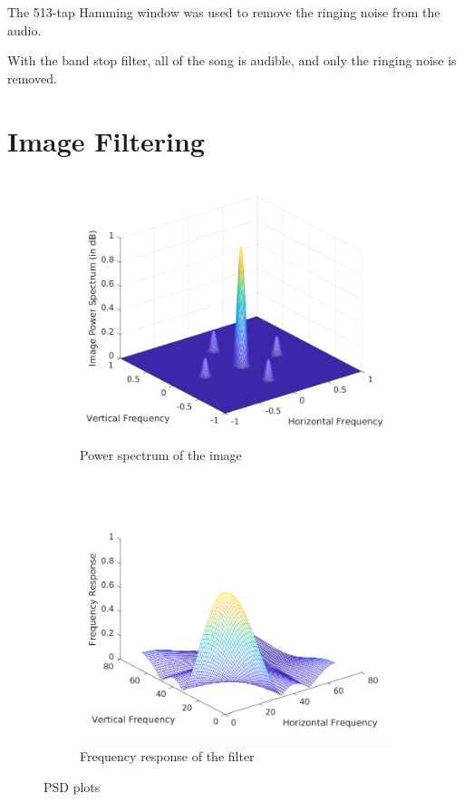 \documentclass{article}
\begin{document}
The 513-tap Hamming window was used to remove the ringing noise from the audio.

With the band stop filter, all of the song is audible, and only the ringing noise is removed.
\section{Image Filtering}

\begin{figure}[H]
    \centering
    \begin{subfigure}[b]{0.45\textwidth}
        \centering
        \includegraphics[width=\textwidth]{plot1.png}
        \caption{Power spectrum of the image}
    \end{subfigure}
    \hfill
    \begin{subfigure}[b]{0.45\textwidth}
        \centering
        \includegraphics[width=\textwidth]{plot.png}
        \caption{Frequency response of the filter}
    \end{subfigure}
    \caption{PSD plots}
\end{figure}
\end{document}
